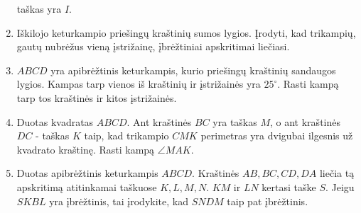 \begin{enumerate}
    taškas yra $I$.
  \item Iškilojo keturkampio priešingų kraštinių sumos lygios.
    Įrodyti, kad trikampių, gautų nubrėžus vieną įstrižainę, 
    įbrėžtiniai apskritimai liečiasi.
  \item $ABCD$ yra apibrėžtinis keturkampis, kurio priešingų
    kraštinių sandaugos lygios. Kampas tarp vienos iš
    kraštinių ir įstrižainės yra $25^\circ$. Rasti kampą tarp
    tos kraštinės ir kitos įstrižainės.
  \item Duotas kvadratas $ABCD$. Ant kraštinės $BC$ yra taškas
    $M$, o ant kraštinės $DC$ - taškas $K$ taip, kad trikampio
    $CMK$ perimetras yra dvigubai ilgesnis už kvadrato
    kraštinę. Rasti kampą $\angle MAK$.
  \item Duotas apibrėžtinis keturkampis $ABCD$. Kraštinės $AB,
    BC, CD, DA$ liečia tą apskritimą atitinkamai taškuose $K,
    L, M, N$. $KM$ ir $LN$ kertasi taške $S$. Jeigu $SKBL$ yra
    įbrėžtinis, tai įrodykite, kad $SNDM$ taip pat įbrėžtinis.

\end{enumerate}

